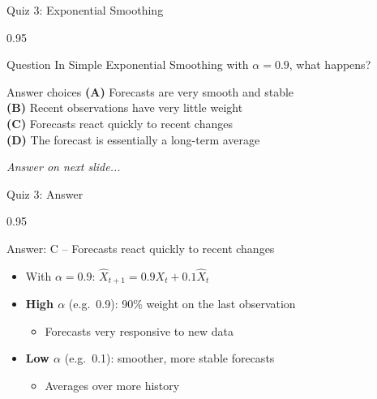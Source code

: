 \documentclass[9pt, aspectratio=169, t]{beamer}
\begin{document}
\begin{frame}{Quiz 3: Exponential Smoothing}
    \begin{cminipage}{0.95\textwidth}
    \begin{alertblock}{Question}
        In Simple Exponential Smoothing with $\alpha = 0.9$, what happens?
    \end{alertblock}

    \vspace{0.4cm}

    \begin{block}{Answer choices}
        \textcolor{MainBlue}{\textbf{(A)}} Forecasts are very smooth and stable\\[3pt]
        \textcolor{MainBlue}{\textbf{(B)}} Recent observations have very little weight\\[3pt]
        \textcolor{MainBlue}{\textbf{(C)}} Forecasts react quickly to recent changes\\[3pt]
        \textcolor{MainBlue}{\textbf{(D)}} The forecast is essentially a long-term average
    \end{block}

    \vspace{0.5cm}

    \begin{center}
        \textit{Answer on next slide...}
    \end{center}
    \end{cminipage}
\end{frame}

\begin{frame}{Quiz 3: Answer}
    \begin{cminipage}{0.95\textwidth}
    \begin{exampleblock}{Answer: C -- Forecasts react quickly to recent changes}
        \begin{itemize}
            \item With $\alpha = 0.9$: $\hat{X}_{t+1} = 0.9 X_t + 0.1 \hat{X}_t$
            \item \textbf{High $\alpha$} (e.g.\ 0.9): 90\% weight on the last observation
                \begin{itemize}
                    \item Forecasts very responsive to new data
                \end{itemize}
            \item \textbf{Low $\alpha$} (e.g.\ 0.1): smoother, more stable forecasts
                \begin{itemize}
                    \item Averages over more history
                \end{itemize}
        \end{itemize}
    \end{exampleblock}

    \end{cminipage}
\end{frame}
\end{document}
